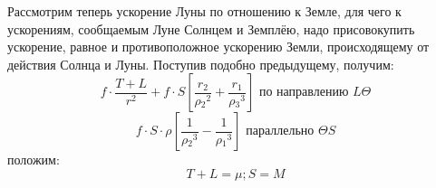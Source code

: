 \documentclass[a4paper,12pt]{book}
\begin{document}
Рассмотрим теперь ускорение Луны по отношению к Земле, для чего к ускорениям, сообщаемым Луне Солнцем и Земплёю, надо присовокупить ускорение, равное и противоположное ускорению Земли, происходящему от действия Солнца и Луны. Поступив подобно предыдущему, получим:
%
\[f \cdot \frac{T+L}{r^2} + f \cdot S \left[\frac{r_2}{\rho{_2}^2} + \frac{r_1}{\rho{_3}^3}\right] \text{ по направлению $L\Theta$}\]
%
\[f \cdot S \cdot \rho \left[\frac{1}{\rho{_2}^3} - \frac{1}{\rho{_1}^3}\right] \text{ параллельно } \Theta S\]
%
положим:
%
\[T+L=\mu; S=M\]

\listoffigures
\begingroup
\let\clearpage\relax
\listoftables
\endgroup
\end{document}
